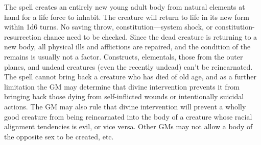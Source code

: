 \begin{multicols}{2}
The spell creates an entirely new young adult body from natural elements at hand for a life force to inhabit.  The creature will return to life in its new form within 1d6 turns.  No saving throw, constitution---system shock, or constitution-resurrection chance need to be checked.  Since the dead creature is returning to a new body, all physical ills and afflictions are repaired, and the condition of the remains is usually not a factor.  Constructs, elementals, those from the outer planes, and undead creatures (even the recently undead) can't be reincarnated.  The spell cannot bring back a creature who has died of old age, and as a further limitation the GM may determine that divine intervention prevents it from bringing back those dying from self-inflicted wounds or intentionally suicidal actions.  The GM may also rule that divine intervention will prevent a wholly good creature from being reincarnated into the body of a creature whose racial alignment tendencies is evil, or vice versa.  Other GMs may not allow a body of the opposite sex to be created, etc.


\end{multicols}
